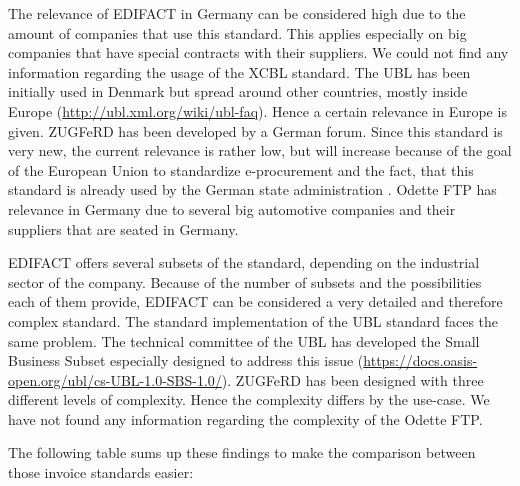 The relevance of EDIFACT in Germany can be considered high due to the amount of companies that use this standard. This applies especially on big companies that have special contracts with their suppliers. We could not find any information regarding the usage of the XCBL standard. The UBL has been initially used in Denmark but spread around other countries, mostly inside Europe (\url{http://ubl.xml.org/wiki/ubl-faq}). Hence a certain relevance in Europe is given. ZUGFeRD has been developed by a German forum. Since this standard is very new, the current relevance is rather low, but will increase because of the goal of the European Union to standardize e-procurement and the fact, that this standard is already used by the German state administration \cite{awv16}. Odette FTP has relevance in Germany due to several big automotive companies and their suppliers that are seated in Germany. 

EDIFACT offers several subsets of the standard, depending on the industrial sector of the company. Because of the number of subsets and the possibilities each of them provide, EDIFACT can be considered a very detailed and therefore complex standard. The standard implementation of the UBL standard faces the same problem. The technical committee of the UBL has developed the Small Business Subset especially designed to address this issue (\url{https://docs.oasis-open.org/ubl/cs-UBL-1.0-SBS-1.0/}). ZUGFeRD has been designed with three different levels of complexity. Hence the complexity differs by the use-case. We have not found any information regarding the complexity of the Odette FTP.

The following table sums up these findings to make the comparison between those invoice standards easier:

